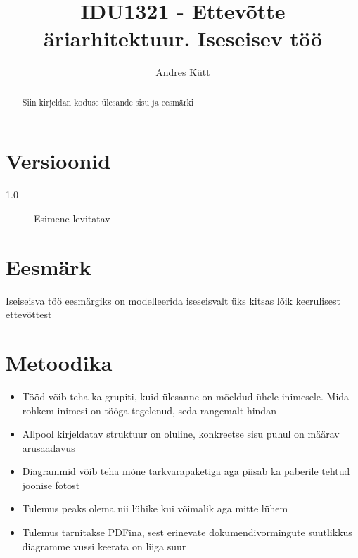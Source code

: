 \documentclass[nobib]{tufte-handout}
\title{IDU1321 - Ettevõtte äriarhitektuur. Iseseisev töö}
\author[Andres Kütt]{Andres Kütt}
\begin{document}
\maketitle
\begin{abstract}
\noindent
Siin kirjeldan koduse ülesande sisu ja eesmärki
\end{abstract}

\section{Versioonid}
\begin{description}
	\item[1.0] Esimene levitatav 
\end{description}

\section{Eesmärk}
Iseiseisva töö eesmärgiks on modelleerida iseseisvalt üks kitsas lõik keerulisest ettevõttest

\section{Metoodika}
\begin{itemize}
	\item Tööd võib teha ka grupiti, kuid ülesanne on mõeldud ühele inimesele. Mida rohkem inimesi on tööga tegelenud, seda rangemalt hindan
	\item Allpool kirjeldatav struktuur on oluline, konkreetse sisu puhul on määrav arusaadavus
	\item Diagrammid võib teha mõne tarkvarapaketiga aga piisab ka paberile tehtud joonise fotost
	\item Tulemus peaks olema nii lühike kui võimalik aga mitte lühem
	\item Tulemus tarnitakse PDFina, sest erinevate dokumendivormingute suutlikkus diagramme vussi keerata on liiga suur
\end{itemize}
\end{document}
